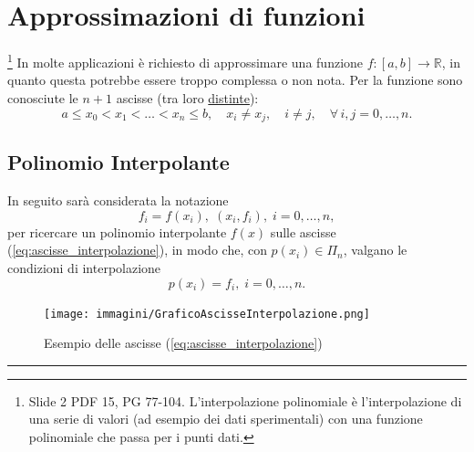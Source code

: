 \section{Approssimazioni di funzioni}
\footnote{Slide 2 PDF 15, PG 77-104. L'interpolazione polinomiale è l'interpolazione di una serie di valori (ad esempio dei dati sperimentali) con una funzione polinomiale che passa per i punti dati.}
In molte applicazioni è richiesto di approssimare una funzione $f:[a,b]\rightarrow\mathbb R$, in quanto questa potrebbe essere troppo complessa o non nota. Per la funzione sono conosciute le $n+1$ ascisse (tra loro \underline{distinte}):
\begin{equation}\label{eq:ascisse_interpolazione}
	a\leq x_0<x_1<\hdots<x_n\leq b,\quad x_i\neq x_j, \quad i\neq j, \quad \forall\, i,j=0,\hdots,n.
\end{equation}

\subsection{Polinomio Interpolante}
In seguito sarà considerata la notazione
\begin{equation*}
    f_i=f(x_i),\; (x_i,f_i),\; i=0,\hdots,n,
\end{equation*}
per ricercare un polinomio interpolante $f(x)$ sulle ascisse (\ref{eq:ascisse_interpolazione}), in modo che, con $p(x_i)\in \Pi_n$, valgano le condizioni di interpolazione 
\begin{equation}\label{eq:condizioni_interpolazione}
    p(x_i)=f_i,\; i=0,\hdots,n.
\end{equation}

\begin{figure}
\centering
\texttt{[image: immagini/GraficoAscisseInterpolazione.png]}
\caption{\label{fig:GraficoAscisseInterp} Esempio delle ascisse (\ref{eq:ascisse_interpolazione})}
\end{figure}

\hrule
\vspace{-0.4cm}
